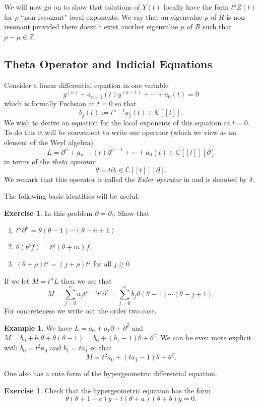 \documentclass[]{book}
\numberwithin{equation}{section}
\theoremstyle{definition}
\newtheorem{example}[theorem]{Example}
\newtheorem{exercise}[theorem]{Exercise}
\theoremstyle{remark}
\newcommand{\ZZ}{\mathbb{Z}}
\newcommand{\CC}{\mathbb{C}}
\begin{document}
We will now go on to show that solutions of $Y(t)$ locally have the form $t^{\rho} Z(t)$ for $\rho$ ``non-resonant'' local exponents. 
We say that an eigenvalue $\rho$ of $R$ is non-resonant provided there doesn't exist another eigenvalue $\mu$ of $R$ such that $\rho-\mu \in \ZZ$. 

\subsection{Theta Operator and Indicial Equations}
Consider a linear differential equation in one variable  
$$ y^{(n)} + a_{n-1}(t) y^{(n-1)} + \cdots + a_0(t) =0 $$
which is formally Fuchsian at $t=0$ so that 
$$b_j(t) := t^{n-1}a_j(t) \in \CC[[t]]. $$
We wish to derive an equation for the local exponents of this equation at $t=0$. 
To do this it will be convenient to write our operator (which we view as an element of the Weyl algebra)
$$L = \partial^n  + a_{n-1}(t) \partial^{n-1} + \cdots + a_0(t) \in \CC[[t]][\partial]$$
in terms of the \emph{theta operator}
$$\theta = t \partial_t \in \CC[[t]][\partial].$$
We remark that this operator is called the \emph{Euler operator} in \cite{Iwasaki1991} and is denoted by $\delta$.

The following basic identities will be useful. 
\begin{exercise}
	In this problem $\partial = \partial_t$. 
	Show that 
	\begin{enumerate}
		\item $t^n\partial^n = \theta(\theta-1)\cdots(\theta - n+1)$
		\item $\theta(t^{\rho} f) =t^{\rho}(\theta+m)f$. 
		\item $(\theta+\rho)t^j = (j+\rho)t^j$ for all $j\geq 0$
	\end{enumerate}
\end{exercise}
If we let $M = t^n L$ then we see that 
 $$ M = \sum_{j=0}^n a_j t^{n-j}t^j \partial^j = \sum_{j=0}^n b_j \theta(\theta-1) \cdots (\theta -j +1).$$
For concreteness we write out the order two case.
\begin{example}\label{E:order-two-theta}
	We have $L = a_0 + a_1 \partial + \partial^2$ and $M = b_0 + b_1\theta +\theta(\theta-1)= b_0 + (b_1-1)\theta + \theta^2$. 
	We can be even more explicit with $b_0 = t^2a_0$ and $b_1 = ta_1$ so that 
	 $$M = t^2a_0 + (ta_1-1)\theta + \theta^2.$$
\end{example}
One also has a cute form of the hypergeometric differential equation.
\begin{exercise}
	Check that the hypergeometric equation has the form 
	$$ \theta(\theta+1-c)y -t(\theta+a)(\theta+b)y =0. $$
\end{exercise}
\end{document}
